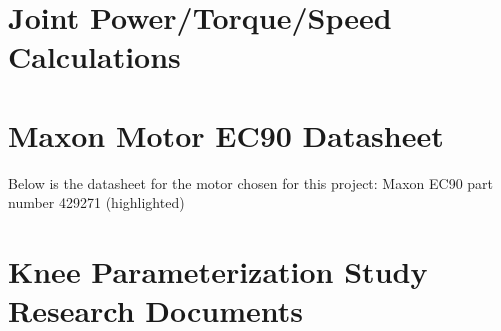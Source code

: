 \appendix

\chapter{Joint Power/Torque/Speed Calculations}
\label{apx:JointPowerTorqueSpeedCalcs}



\chapter{Maxon Motor EC90 Datasheet}
\label{apx:EC90Datasheet}
Below is the datasheet for the motor chosen for this project: Maxon EC90 part number 429271 (highlighted)


\chapter{Knee Parameterization Study Research Documents}
\label{apx:ParamStudyDocs}